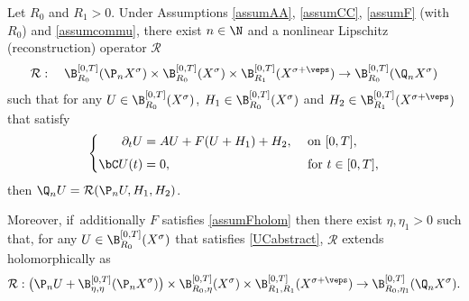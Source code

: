 \begin{theorem}
\label{thmabstract}Let $R_{0}$ and $R_{1}>0$. Under Assumptions \ref{assumAA}, \ref{assumCC}, \ref{assumF} (with $R_{0}$) and \ref{assumcommu}, there exist $n\in \N$ and a nonlinear Lipschitz (reconstruction) operator $\mathcal{R}$
\begin{align}
\label{Rspace}
\mathcal{R}: \quad \B_{R_{0}}^{[0,T]}(\P_n X^{\sigma}) \times \B_{R_{0}}^{[0,T]}(X^{\sigma}) \times \B_{R_{1}}^{[0,T]}(X^{\sigma+\veps}) \to \B_{R_{0}}^{[0,T]}(\Q_n X^{\sigma})
\end{align}
such that for any $U\in \B_{R_{0}}^{[0,T]}(X^{\sigma})$, $H_{1}\in \B_{R_{0}}^{[0,T]}(X^{\sigma})$ and $H_{2}\in \B_{R_{1}}^{[0,T]}(X^{\sigma+\veps})$ that satisfy
\begin{align}\label{UCabstract}
\left\{\begin{aligned}
\partial_t U&=AU+F(U+H_{1})+H_{2}, &&\textnormal{ on } [0,T], \\[3pt]
\bC U(t)&=0, &&\textnormal{ for }t\in [0,T],
\end{aligned}\right.
\end{align}
then $\Q_n U=\mathcal{R}(\P_{n}U,H_{1},H_{2})$.

Moreover, if~additionally $F$ satisfies \cref{assumFholom} then there exist $\eta,\eta_1>0$ such that, for any $U\in \B_{R_{0}}^{[0,T]}(X^{\sigma})$ that satisfies \eqref{UCabstract}, $\mathcal{R}$ extends holomorphically as
\begin{align*}
\mathcal{R}: \bigl( \P_nU+ \B_{\eta,\eta}^{[0,T]}(\P_n X^{\sigma})\bigr) \times \B_{R_{0},\eta}^{[0,T]}(X^{\sigma}) \times \B_{R_{1},R_{1}}^{[0,T]}(X^{\sigma+\veps}) \to \B_{R_{0},\eta_1}^{[0,T]}(\Q_n X^{\sigma}).
\end{align*}
\end{theorem}

